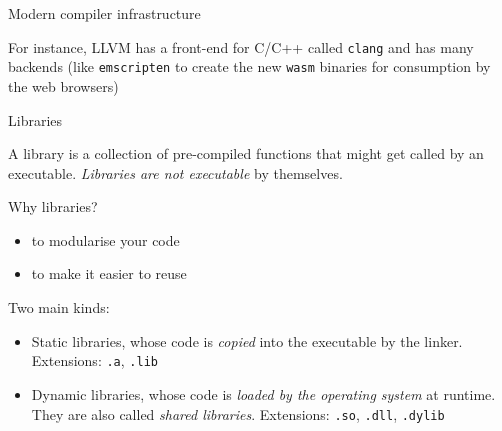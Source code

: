 \documentclass[compress]{beamer}
\begin{document}
\begin{frame}{Modern compiler infrastructure}
    \begin{center}
    \end{center}

    For instance, LLVM has a front-end for C/C++ called \texttt{clang} and has
    many backends (like \texttt{emscripten} to create the new \texttt{wasm}
    binaries for consumption by the web browsers)
\end{frame}

\begin{frame}{Libraries}

    A library is a collection of pre-compiled functions that might get called by
    an executable. \emph{Libraries are not executable} by themselves.

    \begin{exampleblock}{Why libraries?}
        \begin{itemize}
            \item to modularise your code
            \item to make it easier to reuse
        \end{itemize}
    \end{exampleblock}

    \pause

    Two main kinds:

    \begin{itemize}
        \item Static libraries, whose code is \emph{copied} into the executable
            by the linker. Extensions: \texttt{.a}, \texttt{.lib}
        \item Dynamic libraries, whose code is \emph{loaded by the operating
            system} at runtime. They are also called \emph{shared libraries}.
            Extensions: \texttt{.so}, \texttt{.dll}, \texttt{.dylib}
    \end{itemize}

\end{frame}
\end{document}

